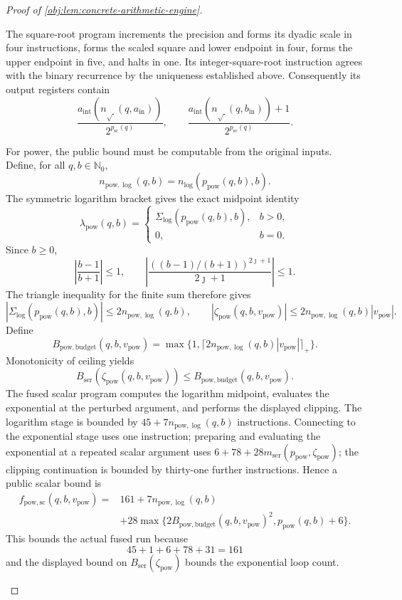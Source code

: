 \documentclass[11pt]{article}
\begin{document}
\begin{proof}[Proof of \cref{obj:lem:concrete-arithmetic-engine}]
\begin{enumerate}
The square-root program increments the precision and forms its dyadic scale in four instructions, forms the scaled square and lower endpoint in four, forms the upper endpoint in five, and halts in one. Its integer-square-root instruction agrees with the binary recurrence by the uniqueness established above. Consequently its output registers contain
\[
\frac{a_{\mathrm{int}}(n_{\sqrt{\ }}(q,a_{\mathrm{in}}))}
     {2^{p_{\mathrm{sc}}(q)}},
\qquad
\frac{a_{\mathrm{int}}(n_{\sqrt{\ }}(q,b_{\mathrm{in}}))+1}
     {2^{p_{\mathrm{sc}}(q)}}.
\]

For power, the public bound must be computable from the original inputs. Define, for all \(q,b\in\mathbb N_0\),
\[
n_{\mathrm{pow},\log}(q,b)
 =n_{\log}(p_{\mathrm{pow}}(q,b),b).
\]
The symmetric logarithm bracket gives the exact midpoint identity
\[
\lambda_{\mathrm{pow}}(q,b)=
\begin{cases}
\Sigma_{\log}(p_{\mathrm{pow}}(q,b),b),&b>0,\\
0,&b=0.
\end{cases}
\]
Since \(b\ge0\),
\[
\left|\frac{b-1}{b+1}\right|\le1,
\qquad
\left|
 \frac{((b-1)/(b+1))^{2\jmath+1}}{2\jmath+1}
\right|\le1.
\]
The triangle inequality for the finite sum therefore gives
\[
|\Sigma_{\log}(p_{\mathrm{pow}}(q,b),b)|
 \le2n_{\mathrm{pow},\log}(q,b),
\qquad
|\zeta_{\mathrm{pow}}(q,b,v_{\mathrm{pow}})|
 \le2n_{\mathrm{pow},\log}(q,b)|v_{\mathrm{pow}}|.
\]
Define
\[
B_{\mathrm{pow},\mathrm{budget}}(q,b,v_{\mathrm{pow}})
 =\max\{1,\lceil
       2n_{\mathrm{pow},\log}(q,b)|v_{\mathrm{pow}}|
       \rceil_+\}.
\]
Monotonicity of ceiling yields
\[
B_{\mathrm{ser}}(\zeta_{\mathrm{pow}}(q,b,v_{\mathrm{pow}}))
 \le B_{\mathrm{pow},\mathrm{budget}}(q,b,v_{\mathrm{pow}}).
\]
The fused scalar program computes the logarithm midpoint, evaluates the exponential at the perturbed argument, and performs the displayed clipping. The logarithm stage is bounded by
\(45+7n_{\mathrm{pow},\log}(q,b)\) instructions. Connecting to the exponential stage uses one instruction; preparing and evaluating the exponential at a repeated scalar argument uses
\(6+78+28m_{\mathrm{ser}}(p_{\mathrm{pow}},\zeta_{\mathrm{pow}})\);
the clipping continuation is bounded by thirty-one further instructions. Hence a public scalar bound is
\[
\begin{split}
f_{\mathrm{pow},\mathrm{sc}}(q,b,v_{\mathrm{pow}})
={}&161+7n_{\mathrm{pow},\log}(q,b)\\
&+28\max\{
  2B_{\mathrm{pow},\mathrm{budget}}(q,b,v_{\mathrm{pow}})^2,
  p_{\mathrm{pow}}(q,b)+6\}.
\end{split}
\]
This bounds the actual fused run because
\[
45+1+6+78+31=161
\]
and the displayed bound on \(B_{\mathrm{ser}}(\zeta_{\mathrm{pow}})\)
bounds the exponential loop count.


\end{enumerate}
\end{proof}
\end{document}
